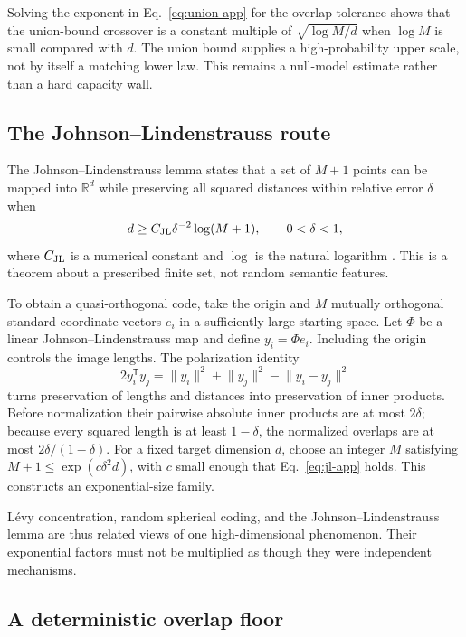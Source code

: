 \documentclass[
  aps,
  reprint,
  superscriptaddress,
  floatfix,
  nofootinbib,
  longbibliography
]{revtex4-2}
\newcommand{\R}{\mathbb{R}}
\newcommand{\T}{^{\mathsf T}}
\newcommand{\norm}[1]{\lVert #1\rVert}
\begin{document}
Solving the exponent in Eq.~\eqref{eq:union-app} for the overlap tolerance
shows that the union-bound crossover is a constant multiple of
$\sqrt{\log M/d}$ when $\log M$ is small compared with $d$.  The union bound
supplies a high-probability upper scale, not by itself a matching lower law.
This remains a null-model estimate rather than a hard capacity wall.

\subsection{The Johnson--Lindenstrauss route}

The Johnson--Lindenstrauss lemma states that a set of $M+1$ points can be mapped
into $\R^d$ while preserving all squared distances within relative error
$\delta$ when
\begin{equation}
 d\geq C_{\rm JL}\delta^{-2}\log(M+1),
 \qquad 0<\delta<1,
 \label{eq:jl-app}
\end{equation}
where $C_{\rm JL}$ is a numerical constant and $\log$ is the natural logarithm
\cite{johnson-1984,Dasgupta-2003}.  This is a theorem about a prescribed finite
set, not random semantic features.

To obtain a quasi-orthogonal code, take the origin and $M$ mutually orthogonal
standard coordinate vectors $e_i$ in a sufficiently large starting space.
Let $\Phi$ be a linear Johnson--Lindenstrauss map and define
$y_i=\Phi e_i$.  Including the origin controls the image lengths.  The
polarization identity
\begin{equation}
 2y_i\T y_j=\norm{y_i}^2+\norm{y_j}^2-\norm{y_i-y_j}^2
 \label{eq:polarization-app}
\end{equation}
turns preservation of lengths and distances into preservation of inner
products.  Before normalization their pairwise absolute inner products are at
most $2\delta$; because every squared length is at least $1-\delta$, the
normalized overlaps are at most $2\delta/(1-\delta)$.  For a fixed target
dimension $d$, choose an integer $M$ satisfying
$M+1\leq\exp(c\delta^2d)$, with $c$ small enough that
Eq.~\eqref{eq:jl-app} holds.  This constructs an exponential-size family.

L\'evy concentration, random spherical coding, and the
Johnson--Lindenstrauss lemma are thus related views of one high-dimensional
phenomenon.  Their exponential factors must not be multiplied as though they
were independent mechanisms.

\subsection{A deterministic overlap floor}
\end{document}

